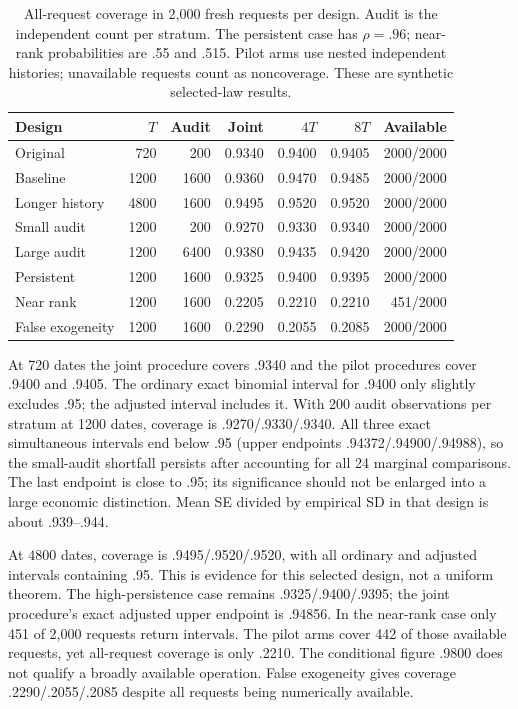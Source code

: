 \begin{table}[htbp]
\centering\small
\begin{tabular}{lrrrrrr}
\toprule
Design & $T$ & Audit & Joint & $4T$ & $8T$ & Available\\
\midrule
Original & 720 & 200 & 0.9340 & 0.9400 & 0.9405 & 2000/2000\\
Baseline & 1200 & 1600 & 0.9360 & 0.9470 & 0.9485 & 2000/2000\\
Longer history & 4800 & 1600 & 0.9495 & 0.9520 & 0.9520 & 2000/2000\\
Small audit & 1200 & 200 & 0.9270 & 0.9330 & 0.9340 & 2000/2000\\
Large audit & 1200 & 6400 & 0.9380 & 0.9435 & 0.9420 & 2000/2000\\
Persistent & 1200 & 1600 & 0.9325 & 0.9400 & 0.9395 & 2000/2000\\
Near rank & 1200 & 1600 & 0.2205 & 0.2210 & 0.2210 & 451/2000\\
False exogeneity & 1200 & 1600 & 0.2290 & 0.2055 & 0.2085 & 2000/2000\\
\bottomrule
\end{tabular}
\caption{All-request coverage in 2,000 fresh requests per design. Audit is the independent count per stratum. The persistent case has $\rho=.96$; near-rank probabilities are .55 and .515. Pilot arms use nested independent histories; unavailable requests count as noncoverage. These are synthetic selected-law results.}
\label{tab:v10:coverage}
\end{table}
At 720 dates the joint procedure covers .9340 and the pilot procedures
cover .9400 and .9405. The ordinary exact binomial interval for .9400 only
slightly excludes .95; the adjusted interval includes it. With 200 audit
observations per stratum at 1200 dates, coverage is .9270/.9330/.9340. All
three exact simultaneous intervals end below .95 (upper endpoints
.94372/.94900/.94988), so the small-audit shortfall persists after accounting
for all 24 marginal comparisons. The last endpoint is close to .95; its
significance should not be enlarged into a large economic distinction.
Mean SE divided by empirical SD in that design is about .939--.944.

At 4800 dates, coverage is .9495/.9520/.9520, with all ordinary and adjusted
intervals containing .95. This is evidence for this selected design, not a
uniform theorem. The high-persistence case remains .9325/.9400/.9395; the
joint procedure's exact adjusted upper endpoint is .94856. In the near-rank
case only 451 of 2,000 requests return intervals. The pilot arms cover 442
of those available requests, yet all-request coverage is only .2210. The
conditional figure .9800 does not qualify a broadly available operation.
False exogeneity gives coverage .2290/.2055/.2085 despite all requests being
numerically available.

